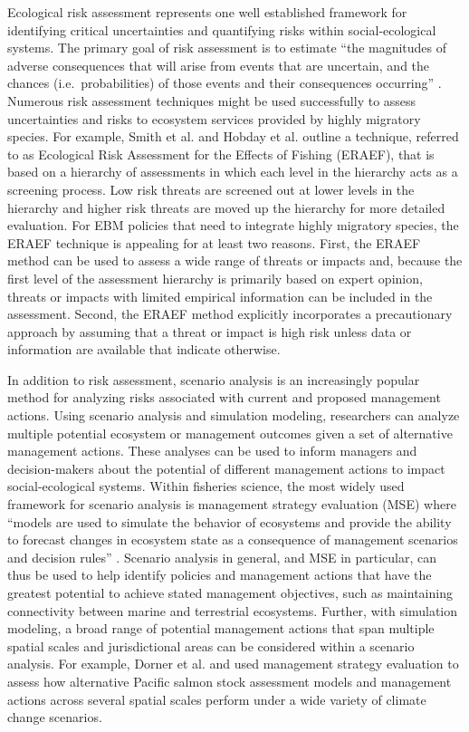Ecological risk assessment represents one well established framework for
identifying critical uncertainties and quantifying risks within
social-ecological systems. The primary goal of risk assessment is to
estimate ``the magnitudes of adverse consequences that will arise from
events that are uncertain, and the chances (i.e.~probabilities) of those
events and their consequences occurring'' \citep{Peterman2004a}.
Numerous risk assessment techniques might be used successfully to assess
uncertainties and risks to ecosystem services provided by highly
migratory species. For example, Smith et al. \citet{Smith2007} and
Hobday et al. \citet{Hobday2011} outline a technique, referred to as
Ecological Risk Assessment for the Effects of Fishing (ERAEF), that is
based on a hierarchy of assessments in which each level in the hierarchy
acts as a screening process. Low risk threats are screened out at lower
levels in the hierarchy and higher risk threats are moved up the
hierarchy for more detailed evaluation. For EBM policies that need to
integrate highly migratory species, the ERAEF technique is appealing for
at least two reasons. First, the ERAEF method can be used to assess a
wide range of threats or impacts and, because the first level of the
assessment hierarchy is primarily based on expert opinion, threats or
impacts with limited empirical information can be included in the
assessment. Second, the ERAEF method explicitly incorporates a
precautionary approach by assuming that a threat or impact is high risk
unless data or information are available that indicate otherwise.

In addition to risk assessment, scenario analysis is an increasingly
popular method for analyzing risks associated with current and proposed
management actions. Using scenario analysis and simulation modeling,
researchers can analyze multiple potential ecosystem or management
outcomes given a set of alternative management actions. These analyses
can be used to inform managers and decision-makers about the potential
of different management actions to impact social-ecological systems.
Within fisheries science, the most widely used framework for scenario
analysis is management strategy evaluation (MSE) where ``models are used
to simulate the behavior of ecosystems and provide the ability to
forecast changes in ecosystem state as a consequence of management
scenarios and decision rules'' \citep{Levin2009}. Scenario analysis in
general, and MSE in particular, can thus be used to help identify
policies and management actions that have the greatest potential to
achieve stated management objectives, such as maintaining connectivity
between marine and terrestrial ecosystems. Further, with simulation
modeling, a broad range of potential management actions that span
multiple spatial scales and jurisdictional areas can be considered
within a scenario analysis. For example, Dorner et al.
\citet{Dorner2009a} and \citet{Dorner2013} used management strategy
evaluation to assess how alternative Pacific salmon stock assessment
models and management actions across several spatial scales perform
under a wide variety of climate change scenarios.

